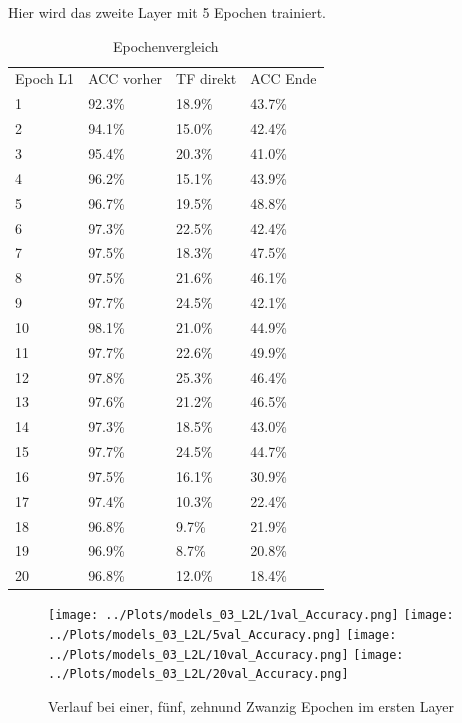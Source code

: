     Hier wird das zweite Layer mit 5 Epochen trainiert.
    \begin{table}[h!]
        \begin{center}
            \caption{Epochenvergleich}
            \label{tab3:Table}
            \begin{tabular}{l|l|l|l}
                Epoch L1 & ACC vorher & TF direkt & ACC Ende \\
                1 & 92.3\% & 18.9\% & 43.7\% \\
                2 & 94.1\% & 15.0\% & 42.4\% \\
                3 & 95.4\% & 20.3\% & 41.0\% \\
                4 & 96.2\% & 15.1\% & 43.9\% \\
                5 & 96.7\% & 19.5\% & 48.8\% \\
                6 & 97.3\% & 22.5\% & 42.4\% \\
                7 & 97.5\% & 18.3\% & 47.5\% \\
                8 & 97.5\% & 21.6\% & 46.1\% \\
                9 & 97.7\% & 24.5\% & 42.1\% \\
                10 & 98.1\% & 21.0\% & 44.9\% \\
                11 & 97.7\% & 22.6\% & 49.9\% \\
                12 & 97.8\% & 25.3\% & 46.4\% \\
                13 & 97.6\% & 21.2\% & 46.5\% \\
                14 & 97.3\% & 18.5\% & 43.0\% \\
                15 & 97.7\% & 24.5\% & 44.7\% \\
                16 & 97.5\% & 16.1\% & 30.9\% \\
                17 & 97.4\% & 10.3\% & 22.4\% \\
                18 & 96.8\% & 9.7\% & 21.9\% \\
                19 & 96.9\% & 8.7\% & 20.8\% \\
                20 & 96.8\% & 12.0\% & 18.4\% \\
            \end{tabular}
        \end{center}
    \end{table}

    \begin{figure}[htpb]
        \texttt{[image: ../Plots/models\_03\_L2L/1val\_Accuracy.png]}
        \texttt{[image: ../Plots/models\_03\_L2L/5val\_Accuracy.png]}
        \texttt{[image: ../Plots/models\_03\_L2L/10val\_Accuracy.png]}
        \texttt{[image: ../Plots/models\_03\_L2L/20val\_Accuracy.png]}
        \caption{\label{fig:figure3} Verlauf bei einer, fünf, zehnund Zwanzig Epochen im ersten Layer}
    \end{figure}

